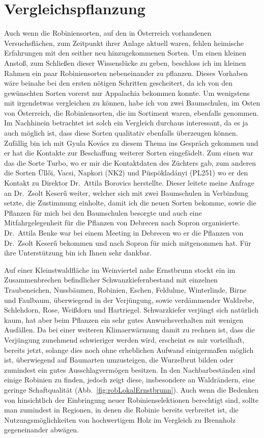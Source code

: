 \documentclass[twocolumn]{scrartcl}
\begin{document}
\section{Vergleichspflanzung}

Auch wenn die Robiniensorten, auf den in Österreich vorhandenen Versuchsflächen,
zum Zeitpunkt ihrer Anlage aktuell waren,
fehlen heimische Erfahrungen mit den seither neu hinzugekommenen Sorten.
Um einen kleinen Anstoß, zum Schließen dieser Wissenslücke zu
geben, beschloss ich im kleinen Rahmen ein paar Robiniensorten
nebeneinander zu pflanzen. Dieses Vorhaben wäre beinahe bei den ersten
nötigen Schritten gescheitert, da ich von den gewünschten Sorten
vorerst nur Appalachia bekommen konnte. Um wenigstens mit irgendetwas
vergleichen zu können, habe ich von zwei Baumschulen, im Osten von
Österreich, die Robiniensorten, die im Sortiment waren, ebenfalls
genommen. Im Nachhinein betrachtet ist solch ein Vergleich durchaus
interessant, da es ja auch möglich ist, dass diese Sorten qualitativ
ebenfalls überzeugen können. Zufällig bin ich mit Gyula Kovács zu
diesem Thema ins Gespräch gekommen und er hat die Kontakte zur
Beschaffung weiterer Sorten eingefädelt. Zum einen war das die Sorte
Turbo, wo er mir die Kontaktdaten des Züchters gab, zum anderen die
Sorten Üllői, Vacsi, Napkori (NK2) und Püspökladányi (PL251)
wo er den
Kontakt zu Direktor Dr.~Attila Borovics herstellte. Dieser leitete
meine Anfrage an Dr.~Zsolt Keserű weiter, welcher sich mit zwei
Baumschulen in Verbindung setzte, die Zustimmung einholte, damit ich
die neuen Sorten bekomme, sowie die Pflanzen für mich bei den
Baumschulen besorgte und auch eine Mitfahrgelegenheit für die Pflanzen
von Debrecen nach Sopron organisierte. Dr.~Attila Benke war bei einem
Meeting in Debrecen wo er die Pflanzen von Dr.~Zsolt Keserű bekommen
und nach Sopron für mich mitgenommen hat.
Für ihre Unterstützung bin ich Ihnen sehr dankbar.

Auf einer Kleinstwaldfläche im Weinviertel nahe Ernstbrunn stockt ein im
Zusammenbrechen befindlicher Schwanzkiefernbestand mit einzelnen Traubeneichen,
Nussbäumen, Robinien, Eschen, Feldulme, Winterlinde, Birne und Faulbaum,
überwiegend in der Verjüngung, sowie verdämmender Waldrebe, Schlehdorn, Rose,
Weißdorn und Hartriegel. Schwarzkiefer verjüngt sich natürlich kaum, hat aber
beim Pflanzen ein sehr gutes Anwuchsverhalten mit wenigen Ausfällen. Da bei
einer weiteren Klimaerwärmung damit zu rechnen ist, dass die Verjüngung
zunehmend schwieriger werden wird, erscheint es mir vorteilhaft, bereits jetzt,
solange dies noch ohne erheblichen Aufwand einigermaßen möglich ist, überwiegend
auf Baumarten umzusteigen, die Wurzelbrut bilden oder zumindest ein gutes
Ausschlagvermögen besitzen. In den Nachbarbeständen sind einige Robinien zu
finden, jedoch zeigt diese, insbesondere an Waldrändern, eine geringe
Schaftqualität (Abb.~\ref{fig:robLokalErnstbrunn}). Auch wenn die Bedenken von
\cite{bouteiller2019robinie} hinsichtlich der Einbringung neuer
Robinienselektionen berechtigt sind, sollte man zumindest in Regionen, in denen
die Robinie bereits verbreitet ist, die Nutzungsmöglichkeiten von hochwertigem
Holz im Vergleich zu Brennholz gegeneinander abwägen.
\end{document}
